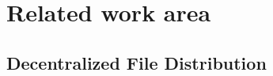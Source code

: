 \documentclass[english, biblatex, digitaloutput]{kththesis}
\begin{document}








\section{Related work area}

\subsection{Decentralized File Distribution}
\end{document}
